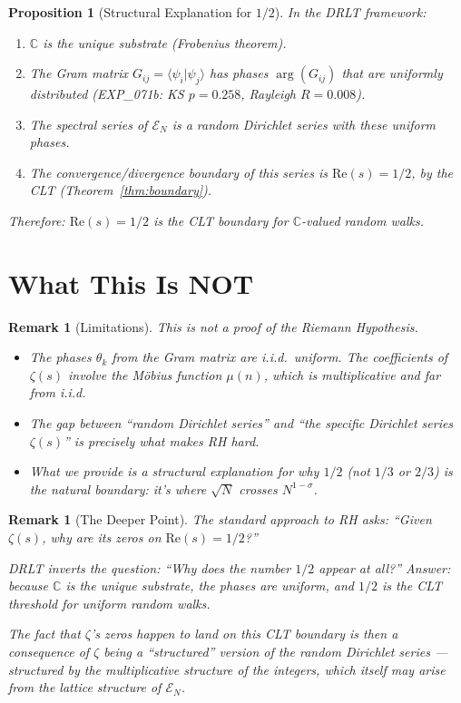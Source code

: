 \documentclass[11pt]{article}
\newtheorem{proposition}[theorem]{Proposition}
\newtheorem{remark}[theorem]{Remark}
\begin{document}
\begin{proposition}[Structural Explanation for $1/2$]
In the DRLT framework:
\begin{enumerate}
  \item $\mathbb{C}$ is the unique substrate (Frobenius theorem).
  \item The Gram matrix $G_{ij} = \langle\psi_i|\psi_j\rangle$ has
    phases $\arg(G_{ij})$ that are uniformly distributed
    (EXP\_071b: KS $p = 0.258$, Rayleigh $R = 0.008$).
  \item The spectral series of $\mathcal{E}_N$ is a random Dirichlet
    series with these uniform phases.
  \item The convergence/divergence boundary of this series is
    $\mathrm{Re}(s) = 1/2$, by the CLT (Theorem~\ref{thm:boundary}).
\end{enumerate}
Therefore: $\mathrm{Re}(s) = 1/2$ is the CLT boundary for
$\mathbb{C}$-valued random walks.
\end{proposition}

\section{What This Is NOT}

\begin{remark}[Limitations]
This is \emph{not} a proof of the Riemann Hypothesis.
\begin{itemize}
  \item The phases $\theta_k$ from the Gram matrix are i.i.d.\ uniform.
    The coefficients of $\zeta(s)$ involve the M\"obius function
    $\mu(n)$, which is multiplicative and far from i.i.d.
  \item The gap between ``random Dirichlet series'' and
    ``the specific Dirichlet series $\zeta(s)$'' is precisely
    what makes RH hard.
  \item What we provide is a \emph{structural explanation} for
    why $1/2$ (not $1/3$ or $2/3$) is the natural boundary:
    it's where $\sqrt{N}$ crosses $N^{1-\sigma}$.
\end{itemize}
\end{remark}

\begin{remark}[The Deeper Point]
The standard approach to RH asks: ``Given $\zeta(s)$, why are
its zeros on $\mathrm{Re}(s) = 1/2$?''

DRLT inverts the question: ``Why does the number $1/2$ appear at all?''
Answer: because $\mathbb{C}$ is the unique substrate, the phases are
uniform, and $1/2$ is the CLT threshold for uniform random walks.

The fact that $\zeta$'s zeros happen to land on this CLT boundary
is then a consequence of $\zeta$ being a ``structured'' version of
the random Dirichlet series --- structured by the multiplicative
structure of the integers, which itself may arise from the lattice
structure of $\mathcal{E}_N$.
\end{remark}
\end{document}

